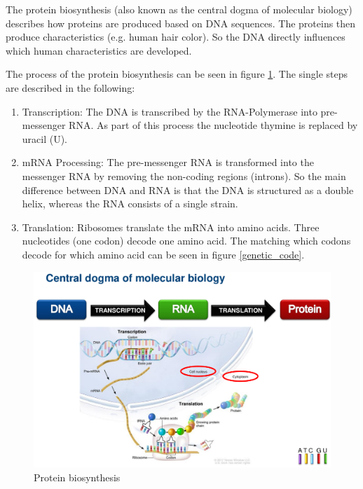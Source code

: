 The protein biosynthesis (also known as the central dogma of molecular biology) describes how proteins are produced based on \ac{DNA} sequences. The proteins then produce characteristics (e.g. human hair color). So the \ac{DNA} directly influences which human characteristics are developed.  \cite[p. 6]{schererStatisticalGeneticsGenetic2021}

The process of the protein biosynthesis can be seen in figure \ref{protein_biosynthesis}. The single steps are described in the following:
\begin{enumerate}
	\item Transcription: The \ac{DNA} is transcribed by the RNA-Polymerase into pre-messenger RNA. As part of this process the nucleotide thymine is replaced by uracil (U). \cite[p. 9]{schererStatisticalGeneticsGenetic2021}
	\item mRNA Processing: The pre-messenger RNA is transformed into the messenger RNA by removing the non-coding regions (introns). So the main difference between \ac{DNA} and \ac{RNA} is that the \ac{DNA} is structured as a double helix, whereas the \ac{RNA} consists of a single strain. \cite[p. 9]{schererStatisticalGeneticsGenetic2021}
	\item Translation: Ribosomes translate the mRNA into amino acids. Three nucleotides (one codon) decode one amino acid. The matching which codons decode for which amino acid can be seen in figure \ref{genetic_code}. \cite[p. 9]{schererStatisticalGeneticsGenetic2021}
\end{enumerate}

\begin{figure}[ht]
	\centering
	\includegraphics[width=1.0\linewidth]{figures/dogmaMolecularBiology.png}
	\caption{Protein biosynthesis \cite{schererStatisticalGeneticsGenetic2021}}
	\label{protein_biosynthesis}
\end{figure}

